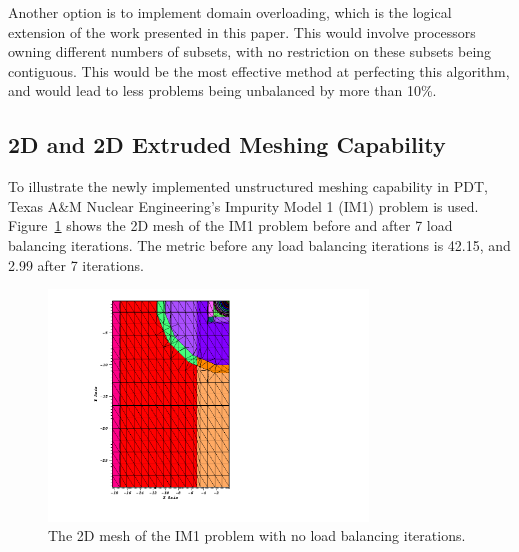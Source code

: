 \documentclass{anstrans}
\begin{document}
Another option is to implement domain overloading\cite{mpadams2015}, which is the logical extension of the work presented in this paper. This would involve processors owning different numbers of subsets, with no restriction on these subsets being contiguous. This would be the most effective method at perfecting this algorithm, and would lead to less problems being unbalanced by more than 10\%.

\subsection{2D and 2D Extruded Meshing Capability}

To illustrate the newly implemented unstructured meshing capability in PDT, Texas A\&M Nuclear Engineering's Impurity Model 1 (IM1) problem is used. Figure~\ref{IM12D} shows the 2D mesh of the IM1 problem before and after 7 load balancing iterations. The metric before any load balancing iterations is 42.15, and 2.99 after 7 iterations.


\begin{figure}
\centering
\includegraphics[width=85mm]{figures/IM1_pre_iterations0000.png}
\caption{The 2D mesh of the IM1 problem with no load balancing iterations.}
\label{IM12D}
\end{figure}
\end{document}
